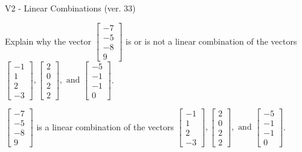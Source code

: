 \begin{exercise}
  \begin{exerciseTitle}V2 - Linear Combinations (ver. 33)\end{exerciseTitle}
  \begin{exerciseStatement}
    Explain why the vector \(\left[\begin{array}{c}
-7 \\
-5 \\
-8 \\
9
\end{array}\right]\)  is or is not a linear 
	combination of the vectors \(\left[\begin{array}{c}
-1 \\
1 \\
2 \\
-3
\end{array}\right] , \left[\begin{array}{c}
2 \\
0 \\
2 \\
2
\end{array}\right] , \text{ and } \left[\begin{array}{c}
-5 \\
-1 \\
-1 \\
0
\end{array}\right]\).
	


  \end{exerciseStatement}
  \begin{exerciseAnswer}
   \(\left[\begin{array}{c}
-7 \\
-5 \\
-8 \\
9
\end{array}\right]\) 
  	 is  
	a linear combination of the vectors \(\left[\begin{array}{c}
-1 \\
1 \\
2 \\
-3
\end{array}\right] , \left[\begin{array}{c}
2 \\
0 \\
2 \\
2
\end{array}\right] , \text{ and } \left[\begin{array}{c}
-5 \\
-1 \\
-1 \\
0
\end{array}\right]\).

	
  


  \end{exerciseAnswer}
\end{exercise}